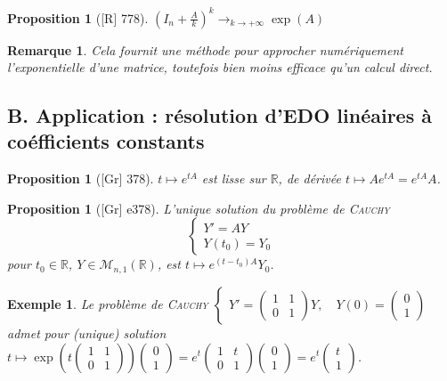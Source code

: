 \documentclass[10pt, a4paper, parskip=full, twoside, twocolumn]{report}
\newtheorem{proposition}[definition]{Proposition}
\newtheorem{example}[definition]{Exemple}
\newtheorem{remark}[definition]{Remarque}
\newcommand{\IR}{\mathbb{R}}
\begin{document}
\begin{proposition}[\textnormal{[R] 778}]
	$\left(I_n + \frac{A}{k}\right)^k \to_{k\to +\infty} \exp(A)$
\end{proposition}

\begin{remark}
	Cela fournit une méthode pour approcher numériquement l'exponentielle d'une matrice, toutefois bien moins efficace qu'un calcul direct.
\end{remark}

\subsection*{B. Application : résolution d'EDO linéaires à coéfficients constants}
\begin{proposition}[\textnormal{[Gr] 378}]
	$t\mapsto e^{tA}$ est lisse sur $\IR$, de dérivée $t\mapsto Ae^{tA} = e^{tA}A$.
\end{proposition}

\begin{proposition}[\textnormal{[Gr] e378}]
	L'unique solution du problème de \textsc{Cauchy}
	$$\begin{cases}
		Y' = AY \\ Y(t_0) = Y_0
	\end{cases}$$
	pour $t_0\in \IR$, $Y\in\mathcal{M}_{n,1}(\IR)$, est $t\mapsto e^{(t-t_0)A}Y_0$.
\end{proposition}

\begin{example}
	Le problème de \textsc{Cauchy}
	$\begin{cases}
		Y' = \begin{pmatrix}
			1&1\\0&1
		\end{pmatrix}Y,\quad Y(0) = \begin{pmatrix}
			0\\1
		\end{pmatrix}
	\end{cases}$
	admet pour (unique) solution $t\mapsto \exp\left(t\begin{pmatrix}
		1&1\\0&1
	\end{pmatrix}\right)\begin{pmatrix}
		0\\1
	\end{pmatrix} = e^t\begin{pmatrix}
		1&t\\0&1
	\end{pmatrix}\begin{pmatrix}
		0\\1
	\end{pmatrix} = e^t\begin{pmatrix}
		t\\1
	\end{pmatrix}$.
\end{example}
\end{document}
